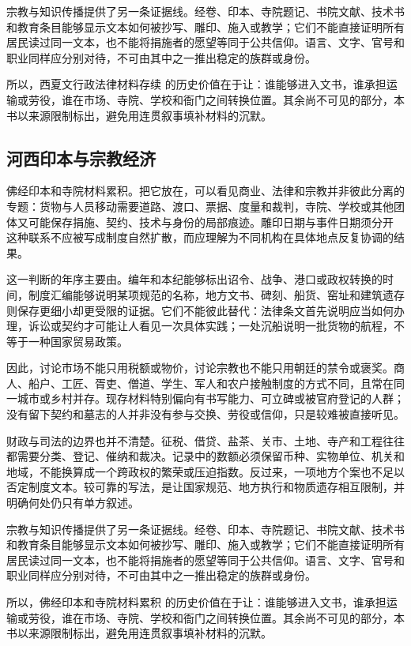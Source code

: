 宗教与知识传播提供了另一条证据线。经卷、印本、寺院题记、书院文献、技术书和教育条目能够显示文本如何被抄写、雕印、施入或教学；它们不能直接证明所有居民读过同一文本，也不能将捐施者的愿望等同于公共信仰。语言、文字、官号和职业同样应分别对待，不可由其中之一推出稳定的族群或身份。

所以，西夏文行政法律材料存续 的历史价值在于让：谁能够进入文书，谁承担运输或劳役，谁在市场、寺院、学校和衙门之间转换位置。其余尚不可见的部分，本书以来源限制标出，避免用连贯叙事填补材料的沉默。

\subsection{河西印本与宗教经济}

佛经印本和寺院材料累积。把它放在，可以看见商业、法律和宗教并非彼此分离的专题：货物与人员移动需要道路、渡口、票据、度量和裁判，寺院、学校或其他团体又可能保存捐施、契约、技术与身份的局部痕迹。雕印日期与事件日期须分开 这种联系不应被写成制度自然扩散，而应理解为不同机构在具体地点反复协调的结果。

这一判断的年序主要由。编年和本纪能够标出诏令、战争、港口或政权转换的时间，制度汇编能够说明某项规范的名称，地方文书、碑刻、船货、窑址和建筑遗存则保存更细小却更受限的证据。它们不能彼此替代：法律条文首先说明应当如何办理，诉讼或契约才可能让人看见一次具体实践；一处沉船说明一批货物的航程，不等于一种国家贸易政策。

因此，讨论市场不能只用税额或物价，讨论宗教也不能只用朝廷的禁令或褒奖。商人、船户、工匠、胥吏、僧道、学生、军人和农户接触制度的方式不同，且常在同一城市或乡村并存。现存材料特别偏向有书写能力、可立碑或被官府登记的人群；没有留下契约和墓志的人并非没有参与交换、劳役或信仰，只是较难被直接听见。

财政与司法的边界也并不清楚。征税、借贷、盐茶、关市、土地、寺产和工程往往都需要分类、登记、催纳和裁决。记录中的数额必须保留币种、实物单位、机关和地域，不能换算成一个跨政权的繁荣或压迫指数。反过来，一项地方个案也不足以否定制度文本。较可靠的写法，是让国家规范、地方执行和物质遗存相互限制，并明确何处仍只有单方叙述。

宗教与知识传播提供了另一条证据线。经卷、印本、寺院题记、书院文献、技术书和教育条目能够显示文本如何被抄写、雕印、施入或教学；它们不能直接证明所有居民读过同一文本，也不能将捐施者的愿望等同于公共信仰。语言、文字、官号和职业同样应分别对待，不可由其中之一推出稳定的族群或身份。

所以，佛经印本和寺院材料累积 的历史价值在于让：谁能够进入文书，谁承担运输或劳役，谁在市场、寺院、学校和衙门之间转换位置。其余尚不可见的部分，本书以来源限制标出，避免用连贯叙事填补材料的沉默。

